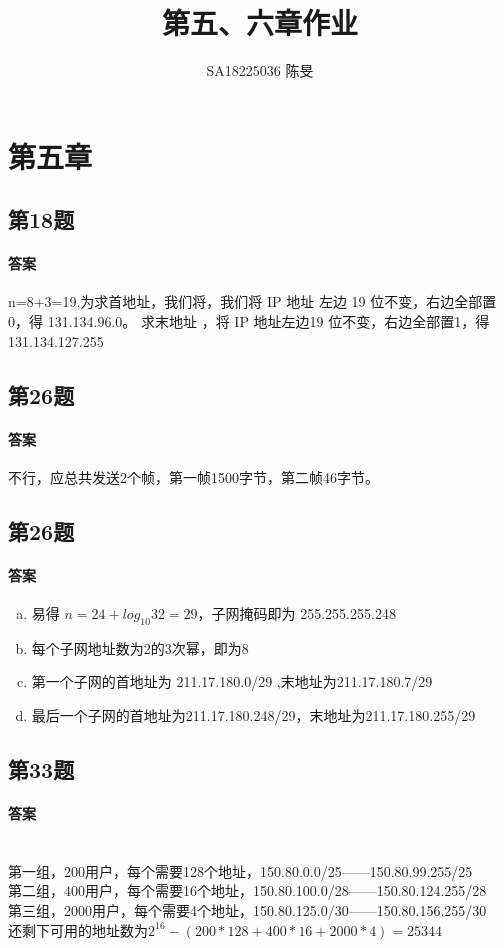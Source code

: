 \documentclass[UTF8]{article}
\title{第五、六章作业}
\author{SA18225036 陈旻}
\begin{document}
\date{}
\maketitle
\section{第五章}
\subsection{第18题}
\paragraph{答案}
n=8+3=19,为求首地址，我们将，我们将 IP 地址 左边 19 位不变，右边全部置0，得 131.134.96.0。 求末地址 ，将 IP 地址左边19 位不变，右边全部置1，得131.134.127.255
\subsection{第26题}
\paragraph{答案}
不行，应总共发送2个帧，第一帧1500字节，第二帧46字节。
\subsection{第26题}
\paragraph{答案}
\begin{enumerate}[a.]
    \item 易得 $ n = 24 + log_{10}32 = 29  $，子网掩码即为 255.255.255.248
    \item 每个子网地址数为2的3次幂，即为8
    \item 第一个子网的首地址为 211.17.180.0/29 ,末地址为211.17.180.7/29 
    \item 最后一个子网的首地址为211.17.180.248/29，末地址为211.17.180.255/29
\end{enumerate}
\subsection{第33题}
\paragraph{答案}
~\\
第一组，200用户，每个需要128个地址，150.80.0.0/25——150.80.99.255/25 \\
第二组，400用户，每个需要16个地址，150.80.100.0/28——150.80.124.255/28 \\
第三组，2000用户，每个需要4个地址，150.80.125.0/30——150.80.156.255/30 \\
还剩下可用的地址数为$ 2^16-(200*128+400*16+2000*4)=25344 $
\end{document}
